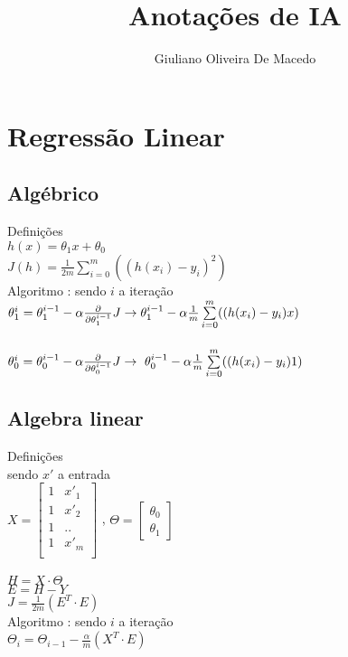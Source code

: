 \documentclass{article}
\title{Anotações de IA}
\author{Giuliano Oliveira De Macedo}
\begin{document}
\fontsize{16}{32} \selectfont
\maketitle
\setcounter{page}{1}
\section{Regressão Linear}
\subsection{Algébrico}
	Definições \\
	$h(x)=\theta_1x+\theta_0$\\
	$J(h)=\frac{1}{2m}\sum\limits_{i=0}^{m}((h(x_i)-y_i)^2)$\\
	Algoritmo : sendo $i$ a iteração \\
	$ \theta^i_1= \theta_1^{i-1} - \alpha \frac{\partial}{\partial \theta_1^{i-1}}J \to  \\
	 \theta_1^{i-1} - \alpha \frac{1}{m}\sum\limits_{i=0}^{m}((h(x_i)-y_i)x)$\\\\
	$ \theta^i_0= \theta_0^{i-1} - \alpha \frac{\partial}{\partial \theta_0^{i-1}}J \to \\
\ \theta_0^{i-1} - \alpha \frac{1}{m}\sum\limits_{i=0}^{m}((h(x_i)-y_i)1)$
\pagebreak
\subsection{Algebra linear}
	Definições \\
	sendo $x'$ a entrada\\
	$X=\begin{bmatrix}
		1 & x'_1 \\
		1 & x'_2 \\
		1 & .. \\
		1 & x'_m \\
	\end{bmatrix}$ ,
	$\Theta=\begin{bmatrix}
		\theta_0\\
		\theta_1
	\end{bmatrix}$ \\ \\
	$H=X \cdot \Theta$ \\
	$E=H - Y $ \\
	$J=\frac{1}{2m}(E^T \cdot E)$ \\
	Algoritmo : sendo $i$ a iteração \\
	$\Theta_i=\Theta_{i-1} - \frac{\alpha}{m}(X^T \cdot E)$\\
	\pagebreak
\end{document}

